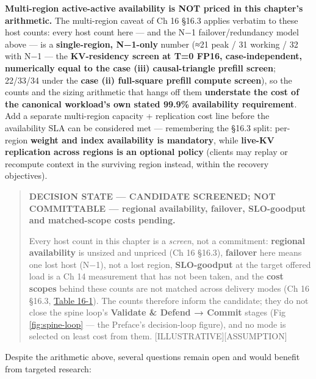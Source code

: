 \textbf{Multi-region active-active availability is NOT priced in this
chapter's arithmetic.} The multi-region caveat of Ch 16 §16.3 applies
verbatim to these host counts: every host count here --- and the N−1
failover/redundancy model above --- is a \textbf{single-region,
N−1-only} number (≈21 peak / 31 working / 32 with N−1 --- the
\textbf{KV-residency screen at T=0 FP16, case-independent, numerically
equal to the case (iii) causal-triangle prefill screen}; 22/33/34 under
the \textbf{case (ii) full-square prefill compute screen}), so the
counts and the sizing arithmetic that hangs off them \textbf{understate
the cost of the canonical workload's own stated 99.9\% availability
requirement}. Add a separate multi-region capacity + replication cost
line before the availability SLA can be considered met --- remembering
the §16.3 split: per-region \textbf{weight and index availability is
mandatory}, while \textbf{live-KV replication across regions is an
optional policy} (clients may replay or recompute context in the
surviving region instead, within the recovery objectives).

\begin{quote}
\textbf{DECISION STATE --- CANDIDATE SCREENED; NOT COMMITTABLE ---
regional availability, failover, SLO-goodput and matched-scope costs
pending.}

Every host count in this chapter is a \emph{screen}, not a commitment:
\textbf{regional availability} is unsized and unpriced (Ch 16 §16.3),
\textbf{failover} here means one lost host (N−1), not a lost region,
\textbf{SLO-goodput} at the target offered load is a Ch 14 measurement
that has not been taken, and the \textbf{cost scopes} behind these
counts are not matched across delivery modes (Ch 16 §16.3, \hyperref[tab:16.1]{Table 16-1}).
The counts therefore inform the candidate; they do not close the spine
loop's \textbf{Validate \& Defend → Commit} stages (Fig
\ref{fig:spine-loop} --- the Preface's decision-loop figure), and no
mode is selected on least cost from them.
\mbox{{[}ILLUSTRATIVE{]}}\hspace{0pt}\mbox{{[}ASSUMPTION{]}}
\end{quote}

\label{what-we-still-dont-know}


Despite the arithmetic above, several questions remain open and would
benefit from targeted research:

